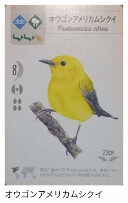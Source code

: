 \begin{figure}[h]
\begin{minipage}[b]{0.23\columnwidth}
    \includegraphics[width=0.9\columnwidth]{2025shinki/wing_span/ougonamerikamusikui.jpg}
    \caption{オウゴンアメリカムシクイ}
    \label{fig:オウゴンアメリカムシクイ}
\end{minipage}
\begin{minipage}[b]{0.23\columnwidth}
  \centering

\end{minipage}
\end{figure}
